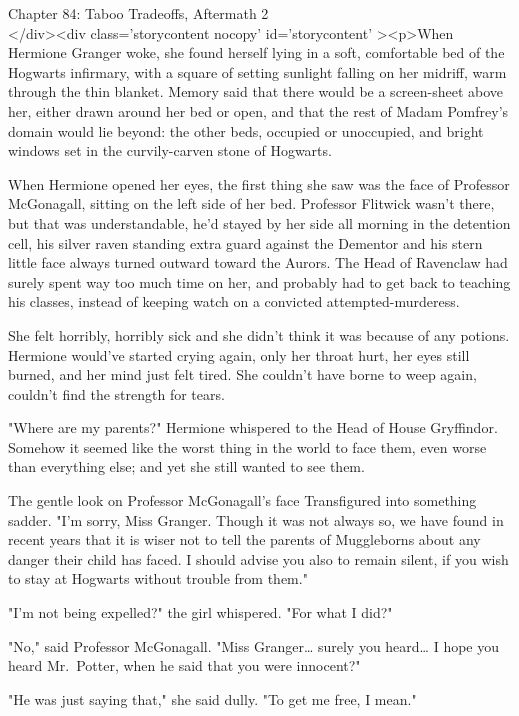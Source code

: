 
Chapter 84: Taboo Tradeoffs, Aftermath 2\\
</div><div  class='storycontent nocopy' id='storycontent' ><p>When Hermione 
Granger woke, she found herself lying in a soft, comfortable bed of the 
Hogwarts infirmary, with a square of setting sunlight falling on her midriff, 
warm through the thin blanket. Memory said that there would be a screen-sheet 
above her, either drawn around her bed or open, and that the rest of Madam 
Pomfrey's domain would lie beyond: the other beds, occupied or unoccupied, and 
bright windows set in the curvily-carven stone of Hogwarts.

When Hermione opened her eyes, the first thing she saw was the face of 
Professor McGonagall, sitting on the left side of her bed. Professor Flitwick 
wasn't there, but that was understandable, he'd stayed by her side all morning 
in the detention cell, his silver raven standing extra guard against the 
Dementor and his stern little face always turned outward toward the Aurors. The 
Head of Ravenclaw had surely spent way too much time on her, and probably had 
to get back to teaching his classes, instead of keeping watch on a convicted 
attempted-murderess.

She felt horribly, horribly sick and she didn't think it was because of any 
potions. Hermione would've started crying again, only her throat hurt, her eyes 
still burned, and her mind just felt tired. She couldn't have borne to weep 
again, couldn't find the strength for tears.

"Where are my parents?" Hermione whispered to the Head of House Gryffindor. 
Somehow it seemed like the worst thing in the world to face them, even worse 
than everything else; and yet she still wanted to see them.

The gentle look on Professor McGonagall's face Transfigured into something 
sadder. "I'm sorry, Miss Granger. Though it was not always so, we have found in 
recent years that it is wiser not to tell the parents of Muggleborns about any 
danger their child has faced. I should advise you also to remain silent, if you 
wish to stay at Hogwarts without trouble from them."

"I'm not being expelled?" the girl whispered. "For what I did?"

"No," said Professor McGonagall. "Miss Granger{\ldots} surely you heard{\ldots} 
I hope you heard Mr.~Potter, when he said that you were innocent?"

"He was just saying that," she said dully. "To get me free, I mean."

